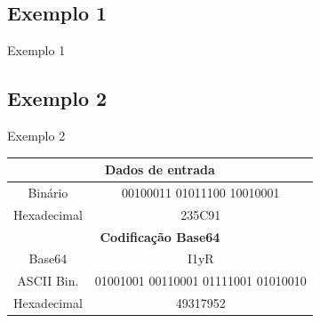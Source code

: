 \documentclass[pdf]{beamer}
\begin{document}
\subsection{Exemplo 1}
\begin{frame}{Exemplo 1}
\transdissolve
\begin{table}
\begin{center}
\end{center}
\end{table}
\end{frame}
\subsection{Exemplo 2}
\begin{frame}{Exemplo 2}
\transdissolve
\begin{table}
\begin{center}
\begin{tabular}{|cc|} \hline
\multicolumn{2}{|c|}{\textbf{Dados de entrada}} \\ \hline
Binário & 00100011 01011100 10010001 \\ \hline
Hexadecimal & 235C91 \\ \hline \hline
\multicolumn{2}{|c|}{\textbf{Codificação Base64}} \\ \hline \hline
Base64 & I1yR \\ \hline
ASCII Bin. & 01001001 00110001 01111001 01010010 \\ \hline
Hexadecimal & 49317952 \\ \hline
\end{tabular}
\end{center}
\end{table}
\end{frame}
\end{document}
